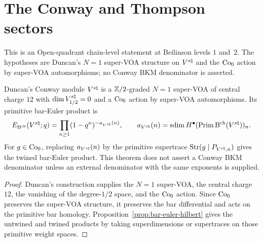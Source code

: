 \section{The Conway and Thompson sectors}
\label{sec:conway-thompson}

\begin{theorem}
\label{thm:conway-chiral-structure}
This is an Open-quadrant chain-level statement at Beilinson levels
$1$ and~$2$. The hypotheses are Duncan's $N{=}1$ super-VOA structure
on $V^{s\natural}$ and the $\mathrm{Co}_0$ action by super-VOA automorphisms; no
Conway BKM denominator is asserted.

Duncan's Conway module $V^{s\natural}$ is a $\mathbb Z/2$-graded
$N{=}1$ super-VOA of central charge $12$ with
$\dim V^{s\natural}_{1/2}=0$ and a $\mathrm{Co}_0$ action by super-VOA
automorphisms.  Its primitive bar-Euler product is
\[
 E_{\mathrm B^{\mathrm{ch}}}(V^{s\natural};q)
 =
 \prod_{n\geq 1}(1-q^n)^{-a_{V^{s\natural}}(n)},
 \qquad
 a_{V^{s\natural}}(n)=\operatorname{sdim} H^\bullet(\operatorname{Prim}\mathrm B^{\mathrm{ch}}(V^{s\natural}))_n .
\]
For $g\in\mathrm{Co}_0$, replacing $a_{V^{s\natural}}(n)$ by the primitive
supertrace $\operatorname{Str}(g\mid P_{V^{s\natural},n})$ gives the twined bar-Euler
product.  This theorem does not assert a Conway BKM denominator
unless an external denominator with the same exponents is supplied.
\end{theorem}

\begin{proof}
Duncan's construction supplies the $N{=}1$ super-VOA, the central
charge $12$, the vanishing of the degree-$1/2$ space, and the
$\mathrm{Co}_0$ action.  Since $\mathrm{Co}_0$ preserves the super-VOA structure, it
preserves the bar differential and acts on the primitive bar
homology.  Proposition~\ref{prop:bar-euler-hilbert} gives the
untwined and twined products by taking superdimensions or
supertraces on those primitive weight spaces.
\end{proof}

